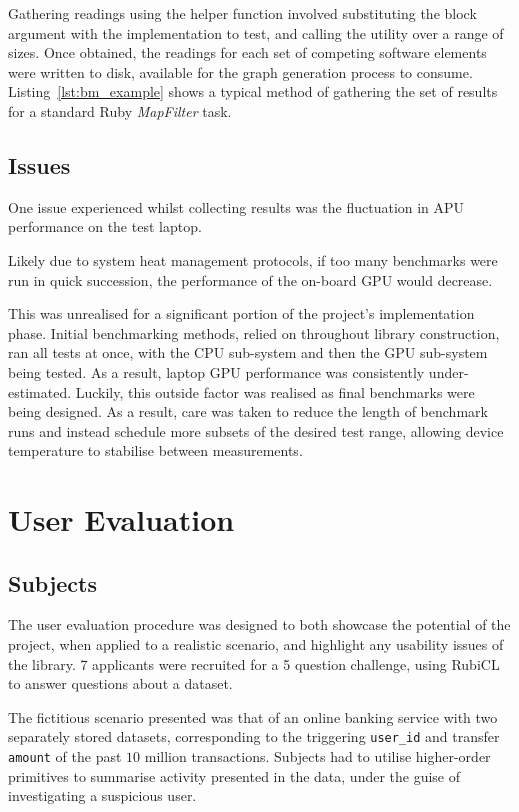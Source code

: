 Gathering readings using the helper function involved substituting the block argument with the implementation to test, and calling the utility over a range of sizes.
Once obtained, the readings for each set of competing software elements were written to disk, available for the graph generation process to consume.
Listing~\ref{lst:bm_example} shows a typical method of gathering the set of results for a standard Ruby \emph{MapFilter} task.


\subsection{Issues}
One issue experienced whilst collecting results was the fluctuation in \ac{APU} performance on the test laptop.

Likely due to system heat management protocols, if too many benchmarks were run in quick succession, the performance of the on-board \ac{GPU} would decrease.

This was unrealised for a significant portion of the project's implementation phase. Initial benchmarking methods, relied on throughout library construction, ran all tests at once, with the \ac{CPU} sub-system and then the \ac{GPU} sub-system being tested. As a result, laptop \ac{GPU} performance was consistently under-estimated. Luckily, this outside factor was realised as final benchmarks were being designed. As a result, care was taken to reduce the length of benchmark runs and instead schedule more subsets of the desired test range, allowing device temperature to stabilise between measurements.

\section{User Evaluation}
\subsection{Subjects}
The user evaluation procedure was designed to both showcase the potential of the project, when applied to a realistic scenario, and highlight any usability issues of the library.
7 applicants were recruited for a 5 question challenge, using RubiCL to answer questions about a dataset.

The fictitious scenario presented was that of an online banking service with two separately stored datasets, corresponding to the triggering \verb|user_id| and transfer \verb|amount| of the past $10$ million transactions. Subjects had to utilise higher-order primitives to summarise activity presented in the data, under the guise of investigating a suspicious user.

